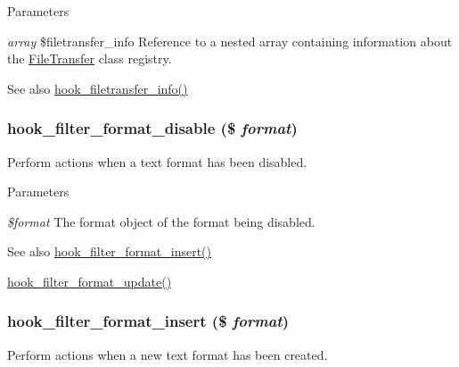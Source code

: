 \begin{DoxyParams}{Parameters}
\item[{\em array}]\$filetransfer\_\-info Reference to a nested array containing information about the \hyperlink{classFileTransfer}{FileTransfer} class registry.\end{DoxyParams}
\begin{DoxySeeAlso}{See also}
\hyperlink{group__hooks_gacecdedb61704444382417e6ec8da240d}{hook\_\-filetransfer\_\-info()} 
\end{DoxySeeAlso}
\hypertarget{group__hooks_gae4873bf6d76c33475296917d304719e9}{
\subsubsection[{hook\_\-filter\_\-format\_\-disable}]{\setlength{\rightskip}{0pt plus 5cm}hook\_\-filter\_\-format\_\-disable (\$ {\em format})}}
\label{group__hooks_gae4873bf6d76c33475296917d304719e9}
Perform actions when a text format has been disabled.


\begin{DoxyParams}{Parameters}
\item[{\em \$format}]The format object of the format being disabled.\end{DoxyParams}
\begin{DoxySeeAlso}{See also}
\hyperlink{group__hooks_ga3729c44379f4e5298c067795e9aca481}{hook\_\-filter\_\-format\_\-insert()} 

\hyperlink{group__hooks_gaf9e4490f3ca224c161481754a3332c92}{hook\_\-filter\_\-format\_\-update()} 
\end{DoxySeeAlso}
\hypertarget{group__hooks_ga3729c44379f4e5298c067795e9aca481}{
\subsubsection[{hook\_\-filter\_\-format\_\-insert}]{\setlength{\rightskip}{0pt plus 5cm}hook\_\-filter\_\-format\_\-insert (\$ {\em format})}}
\label{group__hooks_ga3729c44379f4e5298c067795e9aca481}
Perform actions when a new text format has been created.


